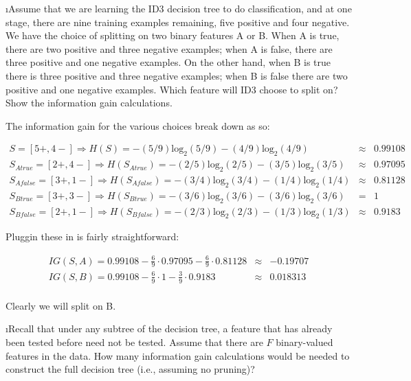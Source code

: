 \documentclass[fleqn]{article}
\begin{document}
\i Assume that we are learning the ID3 decision tree to do classification, and
 at one stage, there are nine training examples remaining, five positive and 
four negative. We have the choice of splitting on two binary features A or B. 
When A is true, there are two positive and three negative examples; when A is 
false, there are three positive and one negative examples. On the other hand, 
when B is true there is three positive and three negative examples; when B is 
false there are two positive and one negative examples. Which feature will ID3 
choose to split on? Show the information gain calculations.

\begin{solution}
The information gain for the various choices break down as so:

\begin{eqnarray*}
S = [5+, 4-] \Rightarrow H(S) = -(5/9) \mbox{log}_2 (5/9) - (4/9) \mbox{log}_2 (4/9) & \approx & 0.99108 \\[0.1in]
S_{Atrue} = [2+, 4-] \Rightarrow H(S_{Atrue}) = -(2/5) \mbox{log}_2 (2/5) - (3/5) \mbox{log}_2 (3/5) & \approx & 0.97095 \\
S_{Afalse} = [3+, 1-] \Rightarrow H(S_{Afalse}) = -(3/4) \mbox{log}_2 (3/4) - (1/4) \mbox{log}_2 (1/4) & \approx & 0.81128 \\[0.1in]
S_{Btrue} = [3+, 3-] \Rightarrow H(S_{Btrue}) = -(3/6) \mbox{log}_2 (3/6) - (3/6) \mbox{log}_2 (3/6) & = & 1 \\
S_{Bfalse} = [2+, 1-] \Rightarrow H(S_{Bfalse}) = -(2/3) \mbox{log}_2 (2/3) - (1/3) \mbox{log}_2 (1/3) & \approx & 0.9183
\end{eqnarray*}

Pluggin these in is fairly straightforward:

\begin{eqnarray*}
IG(S, A) = 0.99108 - \frac{6}{9} \cdot 0.97095 - \frac{6}{9} \cdot 0.81128 & \approx & -0.19707 \\[0.05in]
IG(S, B) = 0.99108 - \frac{6}{9} \cdot 1 - \frac{3}{9} \cdot 0.9183 & \approx & 0.018313 \\
\end{eqnarray*}

Clearly we will split on B.

\end{solution}

\i Recall that under any subtree of the decision tree, a feature that has already 
been tested before need not be tested. Assume that there are $F$ binary-valued 
features in the data. How many information gain calculations would be needed to 
construct the full decision tree (i.e., assuming no pruning)?
\end{document}
